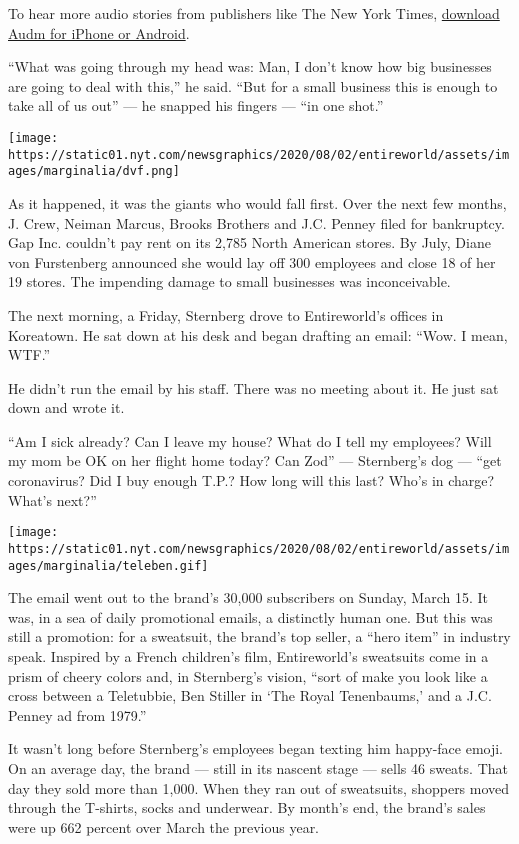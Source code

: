 To hear more audio stories from publishers like The New York Times,
\href{https://www.audm.com/}{download Audm for iPhone or Android}.

``What was going through my head was: Man, I don't know how big
businesses are going to deal with this,'' he said. ``But for a small
business this is enough to take all of us out'' --- he snapped his
fingers --- ``in one shot.''

\texttt{[image: https://static01.nyt.com/newsgraphics/2020/08/02/entireworld/assets/images/marginalia/dvf.png]}

As it happened, it was the giants who would fall first. Over the next
few months, J. Crew, Neiman Marcus, Brooks Brothers and J.C. Penney
filed for bankruptcy. Gap Inc. couldn't pay rent on its 2,785 North
American stores. By July, Diane von Furstenberg announced she would lay
off 300 employees and close 18 of her 19 stores. The impending damage to
small businesses was inconceivable.

The next morning, a Friday, Sternberg drove to Entireworld's offices in
Koreatown. He sat down at his desk and began drafting an email: ``Wow. I
mean, WTF.''

He didn't run the email by his staff. There was no meeting about it. He
just sat down and wrote it.

``Am I sick already? Can I leave my house? What do I tell my employees?
Will my mom be OK on her flight home today? Can Zod'' --- Sternberg's
dog --- ``get coronavirus? Did I buy enough T.P.? How long will this
last? Who's in charge? What's next?''

\texttt{[image: https://static01.nyt.com/newsgraphics/2020/08/02/entireworld/assets/images/marginalia/teleben.gif]}

The email went out to the brand's 30,000 subscribers on Sunday, March
15. It was, in a sea of daily promotional emails, a distinctly human
one. But this was still a promotion: for a sweatsuit, the brand's top
seller, a ``hero item'' in industry speak. Inspired by a French
children's film, Entireworld's sweatsuits come in a prism of cheery
colors and, in Sternberg's vision, ``sort of make you look like a cross
between a Teletubbie, Ben Stiller in `The Royal Tenenbaums,' and a J.C.
Penney ad from 1979.''

It wasn't long before Sternberg's employees began texting him happy-face
emoji. On an average day, the brand --- still in its nascent stage ---
sells 46 sweats. That day they sold more than 1,000. When they ran out
of sweatsuits, shoppers moved through the T-shirts, socks and underwear.
By month's end, the brand's sales were up 662 percent over March the
previous year.

